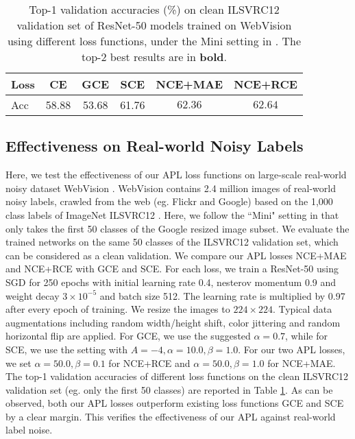 \documentclass{article}
\begin{document}
\begin{table}[h]
\centering
\small
\caption{Top-1 validation accuracies (\%) on clean ILSVRC12 validation set of ResNet-50 models trained on WebVision using different loss functions, under the Mini setting in \cite{jiang2018mentornet}. The top-2 best results are in \textbf{bold}.}

\label{tab:webvision}
\begin{adjustbox}{width=0.49\textwidth}
\begin{tabular}{l|ccccc}
\hline
Loss & CE & GCE & SCE & \textbf{NCE+MAE} & \textbf{NCE+RCE}\\ \hline
Acc & 58.88 & 53.68 &  61.76 & $\bm{62.36}$ & $ \bm{62.64} $\\

\hline
\end{tabular}
\end{adjustbox}
\vspace{-0.1 in}
\end{table}

\subsection{Effectiveness on Real-world Noisy Labels}\label{sec:webvision}
Here, we test the effectiveness of our APL loss functions on large-scale real-world noisy dataset WebVision \cite{li2017webvision}. WebVision contains 2.4 million images of real-world noisy labels, crawled from the web (eg. Flickr and Google) based on the 1,000 class labels of ImageNet ILSVRC12 \cite{deng2009imagenet}. Here, we follow the ``Mini" setting in \cite{jiang2018mentornet} that only takes the first 50 classes of the Google resized image subset. We evaluate the trained networks on the same 50 classes of the ILSVRC12 validation set, which can be considered as a clean validation.
We compare our APL losses NCE+MAE and NCE+RCE with GCE and SCE. 
For each loss, we train a ResNet-50 \cite{he2016deep} using SGD for 250 epochs with initial learning rate 0.4, nesterov momentum 0.9 and weight decay $3\times 10^{-5}$ and batch size 512. The learning rate is multiplied by 0.97 after every epoch of training. 
We resize the images to $224 \times 224$. Typical data augmentations including random width/height shift, color jittering and random horizontal flip are applied. For GCE, we use the suggested $\alpha=0.7$, while for SCE, we use the setting with $A=-4, \alpha=10.0, \beta=1.0$. For our two APL losses, we set $\alpha=50.0, \beta=0.1$ for NCE+RCE and $\alpha=50.0, \beta=1.0$ for NCE+MAE.
The top-1 validation accuracies of different loss functions on the clean ILSVRC12 validation set (eg. only the first 50 classes) are reported in Table \ref{tab:webvision}. As can be observed, both our APL losses outperform existing loss functions GCE and SCE by a clear margin. This verifies the effectiveness of our APL against real-world label noise.
\end{document}
